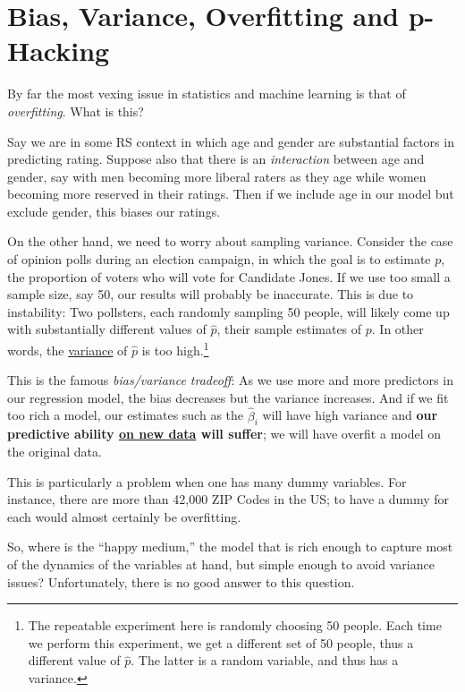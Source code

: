 \section{Bias, Variance, Overfitting and p-Hacking}
\label{overfit}

By far the most vexing issue in statistics and machine learning is that
of \textit{overfitting}.  What is this?

Say we are in some RS context in which age and gender are substantial
factors in predicting rating.  Suppose also that there is an
\textit{interaction} between age and gender, say with men becoming more
liberal raters as they age while women becoming more reserved in their
ratings.  Then if we include age in our model but exclude gender, this
biases our ratings.

On the other hand, we need to worry about sampling variance.  Consider
the case of opinion polls during an election campaign, in which the goal
is to estimate $p$, the proportion of voters who will vote for Candidate
Jones.  If we use too small a sample size, say 50, our results will
probably be inaccurate.  This is due to instability:  Two pollsters,
each randomly sampling 50 people, will likely come up with substantially
different values of $\widehat{p}$, their sample estimates of $p$.  In
other words, the \underline{variance} of $\widehat{p}$ is too
high.\footnote{The repeatable experiment here is randomly choosing 50
people.  Each time we perform this experiment, we get a different set of
50 people, thus a different value of $\widehat{p}$.  The latter is a
random variable, and thus has a variance.}

This is the famous \textit{bias/variance tradeoff}:  As we use more and
more predictors in our regression model, the bias decreases but the
variance increases.  And if we fit too rich a model, our estimates such
as the $\widehat{\beta}_i$ will have high variance and \textbf{our
predictive ability \underline{on new data} will suffer}; we will have
overfit a model on the original data.

This is particularly a problem when one has many dummy variables. For
instance, there are more than 42,000 ZIP Codes in the US; to have a
dummy for each would almost certainly be overfitting.

So, where is the ``happy medium,'' the model that is rich enough to
capture most of the dynamics of the variables at hand, but simple enough
to avoid variance issues?  Unfortunately, there is no good answer to
this question.

